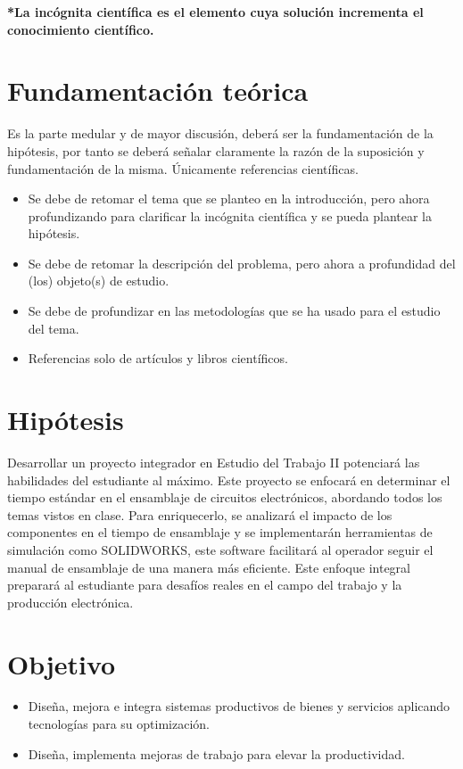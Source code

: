     \textbf{*La incógnita científica es el elemento cuya solución incrementa el conocimiento científico.}
    \section{Fundamentación teórica}
    
    Es la parte medular y de mayor discusión, deberá ser la fundamentación de la hipótesis, por tanto se deberá señalar claramente la razón de la suposición y fundamentación de la misma. Únicamente referencias científicas.
    \begin{itemize}
        \item Se debe de retomar el tema que se planteo en la introducción, pero ahora profundizando para clarificar la incógnita científica y se pueda plantear la hipótesis.
        \item Se debe de retomar la descripción del problema, pero ahora a profundidad del (los) objeto(s) de estudio. 
        \item Se debe de profundizar en las metodologías que se ha usado para el estudio del tema.
        \item Referencias solo de artículos y libros científicos.
    \end{itemize}
    \section{Hipótesis}
    Desarrollar un proyecto integrador en Estudio del Trabajo II potenciará las habilidades del estudiante al máximo. Este proyecto se enfocará en determinar el tiempo estándar en el ensamblaje de circuitos electrónicos, abordando todos los temas vistos en clase. Para enriquecerlo, se analizará el impacto de los componentes en el tiempo de ensamblaje y se implementarán herramientas de simulación como SOLIDWORKS, este software facilitará al operador seguir el manual de ensamblaje de una manera más eficiente.
    Este enfoque integral preparará al estudiante para desafíos reales en el campo del trabajo y la producción electrónica.
    \section{Objetivo}
    
    \begin{itemize}
        \item Diseña, mejora e integra sistemas productivos de bienes y servicios aplicando tecnologías para su optimización.
        \item Diseña, implementa mejoras de trabajo para elevar la productividad.
    \end{itemize}
    
